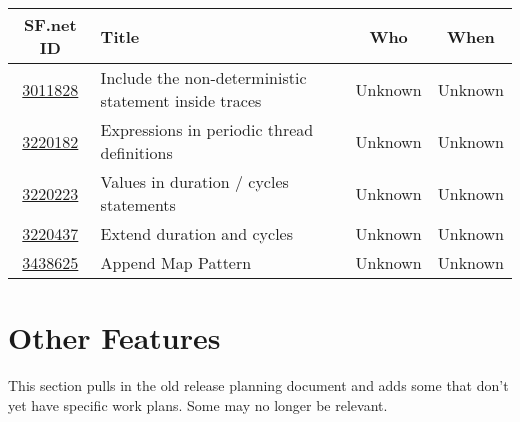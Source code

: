 \documentclass{overturerep}
\begin{document}
\begin{tabular}{clcc}
SF.net ID & Title & Who & When \\
\hline
\href{https://sourceforge.net/tracker/?func=detail&aid=3011828&group_id=141350&atid=1127184}{3011828}
	& Include the non-deterministic statement inside traces
	& Unknown & Unknown 
\\
\href{https://sourceforge.net/tracker/?func=detail&aid=3220182&group_id=141350&atid=1127184}{3220182}
	& Expressions in periodic thread definitions
	& Unknown & Unknown 
\\
\href{https://sourceforge.net/tracker/?func=detail&aid=3220223&group_id=141350&atid=1127184}{3220223}
	& Values in duration / cycles statements	
	& Unknown & Unknown 
\\
\href{https://sourceforge.net/tracker/?func=detail&aid=3220437&group_id=141350&atid=1127184}{3220437}
	& Extend duration and cycles	
	& Unknown & Unknown
\\
\href{https://sourceforge.net/tracker/?func=detail&aid=3438625&group_id=141350&atid=1127184}{3438625}
	& Append Map Pattern
	& Unknown & Unknown
\end{tabular}



\section{Other Features}
This section pulls in the old release planning document and adds some
that don't yet have specific work plans.  Some may no longer be
relevant.
\end{document}
